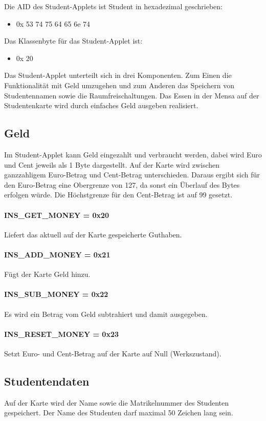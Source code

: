 Die AID des Student-Applets ist Student in hexadezimal geschrieben:
\begin{itemize}
	\item 0x 53 74 75 64 65 6e 74
\end{itemize}
Das Klassenbyte für das Student-Applet ist:
\begin{itemize}
	\item 0x 20
\end{itemize}

Das Student-Applet unterteilt sich in drei Komponenten.
Zum Einen die Funktionalität mit Geld umzugehen und zum Anderen das Speichern von Studentennamen sowie die Raumfreischaltungen.
Das Essen in der Mensa auf der Studentenkarte wird durch einfaches Geld ausgeben realisiert.

\subsection{Geld}
Im Student-Applet kann Geld eingezahlt und verbraucht werden, dabei wird Euro und Cent jeweils als 1 Byte dargestellt.
Auf der Karte wird zwischen ganzzahligem Euro-Betrag und Cent-Betrag unterschieden.
Daraus ergibt sich für den Euro-Betrag eine Obergrenze von 127\texteuro{}, da sonst ein Überlauf des Bytes erfolgen würde.
Die Höchstgrenze für den Cent-Betrag ist auf 99\textcent{} gesetzt.

\paragraph{INS\_GET\_MONEY = 0x20}
Liefert das aktuell auf der Karte gespeicherte Guthaben.
\paragraph{INS\_ADD\_MONEY =  0x21}
Fügt der Karte Geld hinzu.
\paragraph{INS\_SUB\_MONEY = 0x22}
Es wird ein Betrag vom Geld subtrahiert und damit ausgegeben.

\paragraph{INS\_RESET\_MONEY = 0x23}

Setzt Euro- und Cent-Betrag auf der Karte auf Null (Werkszustand).

\subsection{Studentendaten}
Auf der Karte wird der Name sowie die Matrikelnummer des Studenten gespeichert.
Der Name des Studenten darf maximal 50 Zeichen lang sein.

